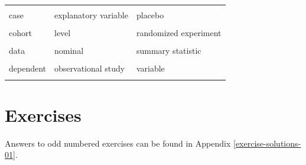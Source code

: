 \documentclass[
  10pt,
  openany]{book}
\begin{document}
\begin{tabu} to 
\toprule
{} &  & \\
case & explanatory variable & placebo\\
 &  & \\
cohort & level & randomized experiment\\
 &  & \\
data & nominal & summary statistic\\
 &  & \\
dependent & observational study & variable\\
 &  & \\
\bottomrule
\end{tabu}

\clearpage

\hypertarget{chp1-exercises}{%
\section{Exercises}\label{chp1-exercises}}

Answers to odd numbered exercises can be found in Appendix \ref{exercise-solutions-01}.
\end{document}
